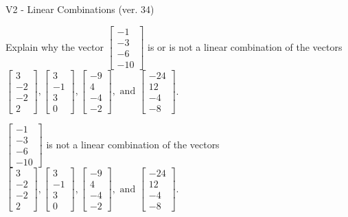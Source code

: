 \begin{exercise}
  \begin{exerciseTitle}V2 - Linear Combinations (ver. 34)\end{exerciseTitle}
  \begin{exerciseStatement}
    Explain why the vector \(\left[\begin{array}{c}
-1 \\
-3 \\
-6 \\
-10
\end{array}\right]\)  is or is not a linear 
	combination of the vectors \(\left[\begin{array}{c}
3 \\
-2 \\
-2 \\
2
\end{array}\right] , \left[\begin{array}{c}
3 \\
-1 \\
3 \\
0
\end{array}\right] , \left[\begin{array}{c}
-9 \\
4 \\
-4 \\
-2
\end{array}\right] , \text{ and } \left[\begin{array}{c}
-24 \\
12 \\
-4 \\
-8
\end{array}\right]\).
	


  \end{exerciseStatement}
  \begin{exerciseAnswer}
   \(\left[\begin{array}{c}
-1 \\
-3 \\
-6 \\
-10
\end{array}\right]\) 
  	 is not  
	a linear combination of the vectors \(\left[\begin{array}{c}
3 \\
-2 \\
-2 \\
2
\end{array}\right] , \left[\begin{array}{c}
3 \\
-1 \\
3 \\
0
\end{array}\right] , \left[\begin{array}{c}
-9 \\
4 \\
-4 \\
-2
\end{array}\right] , \text{ and } \left[\begin{array}{c}
-24 \\
12 \\
-4 \\
-8
\end{array}\right]\).


\end{exerciseAnswer}
\end{exercise}
